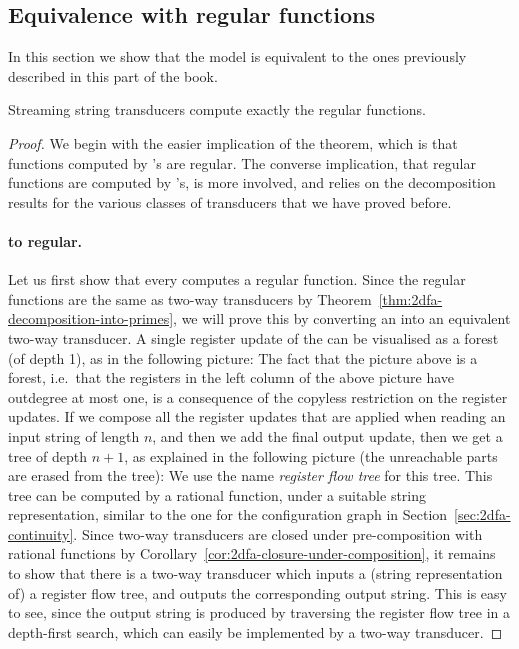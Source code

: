 \subsection{Equivalence with regular functions}
\label{sec:sst-equivalence-two-way}
In this section we show that  the \sst model is equivalent to the ones previously described in this part of the book.
\begin{theorem}
    \label{theorem:sst-two-way-equivalence}
    Streaming string transducers compute exactly the regular functions.
\end{theorem}
\begin{proof} We begin with the easier implication of the theorem, which is that functions computed by \sst's are regular. The converse implication, that regular functions are computed by \sst's, is more involved, and relies on the decomposition results for the various classes of transducers that we have proved before.
\paragraph*{\sst to regular.} Let us first show that every \sst computes a regular function. Since the regular functions are the same as two-way transducers by Theorem~\ref{thm:2dfa-decomposition-into-primes}, we will prove this by converting an \sst into an equivalent two-way transducer. A single register update of the \sst can be visualised as a forest (of depth 1), as in the following picture:
The fact that the picture above is a forest, i.e.~that the registers in the left column of the above picture have outdegree at most one, is a consequence of the copyless restriction on the register updates.
If we compose all the register updates that are applied when reading an input string of length $n$, and then we add the final output update, then we get a tree of depth $n+1$, as explained in the following picture (the unreachable parts are erased from the tree):
We use the name \emph{register flow tree} for this tree. This tree can be computed by a rational function, under a suitable string representation, similar to the one for the configuration graph in Section~\ref{sec:2dfa-continuity}. Since two-way transducers are closed under pre-composition with rational functions by Corollary~\ref{cor:2dfa-closure-under-composition}, it remains to show that there is a two-way transducer which inputs a (string representation of) a  register flow tree, and outputs the corresponding output string. This is easy to see, since the output string is produced by traversing the register flow tree in a depth-first search, which can easily be implemented by a two-way transducer. 


\end{proof}
